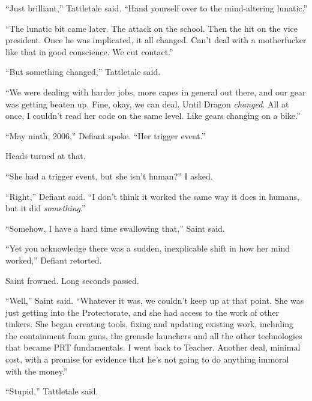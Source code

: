 ``Just brilliant,'' Tattletale said.  ``Hand yourself over to the mind-altering lunatic.''



``The lunatic bit came later.  The attack on the school.  Then the hit on the vice president.  Once he was implicated, it all changed.  Can't deal with a motherfucker like that in good conscience.  We cut contact.''



``But something changed,'' Tattletale said.



``We were dealing with harder jobs, more capes in general out there, and our gear was getting beaten up.  Fine, okay, we can deal.  Until Dragon \emph{changed}.  All at once, I couldn't read her code on the same level.  Like gears changing on a bike.''



``May ninth, 2006,'' Defiant spoke.  ``Her trigger event.''



Heads turned at that.



``She had a trigger event, but she isn't human?''  I asked.



``Right,'' Defiant said.  ``I don't think it worked the same way it does in humans, but it did \emph{something}.''



``Somehow, I have a hard time swallowing that,'' Saint said.



``Yet you acknowledge there was a sudden, inexplicable shift in how her mind worked,'' Defiant retorted.



Saint frowned.  Long seconds passed.



``Well,'' Saint said.  ``Whatever it was, we couldn't keep up at that point.  She was just getting into the Protectorate, and she had access to the work of other tinkers.  She began creating tools, fixing and updating existing work, including the containment foam guns, the grenade launchers and all the other technologies that became PRT fundamentals.  I went back to Teacher.  Another deal, minimal cost, with a promise for evidence that he's not going to do anything immoral with the money.''



``Stupid,'' Tattletale said.



